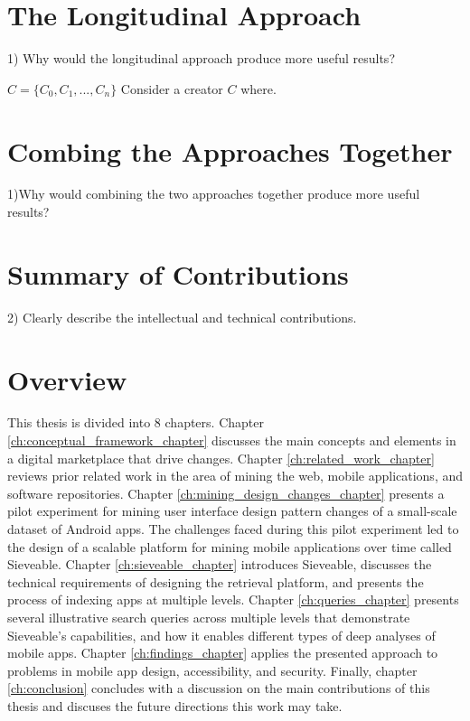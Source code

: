 \section{The Longitudinal Approach}
1) Why would the longitudinal approach produce more useful results?
\pagebreak

$C=\{C_0, C_1,..., C_n\}$ Consider a creator $C$ where.

\section{Combing the Approaches Together}
1)Why would combining the two approaches together produce more useful results?
\pagebreak

\section{Summary of Contributions}
2) Clearly describe the intellectual and technical contributions.
\pagebreak

\section{Overview}
This thesis is divided into 8 chapters.
Chapter \ref{ch:conceptual_framework_chapter} discusses the main concepts and elements in a digital marketplace that drive changes.
Chapter \ref{ch:related_work_chapter} reviews prior related work in the area of mining the web, mobile applications, and software repositories.
Chapter \ref{ch:mining_design_changes_chapter} presents a pilot experiment for mining user interface design pattern changes of a small-scale dataset of Android apps.
The challenges faced during this pilot experiment led to the design of a scalable platform for mining mobile applications over time called Sieveable.
Chapter \ref{ch:sieveable_chapter} introduces Sieveable, discusses the technical requirements of designing the retrieval platform, and presents the process of indexing apps at multiple levels.
Chapter \ref{ch:queries_chapter} presents several illustrative search queries across multiple levels that demonstrate Sieveable's capabilities, and how it enables different types of deep analyses of mobile apps.
Chapter \ref{ch:findings_chapter} applies the presented approach to problems in mobile app design, accessibility, and security.
Finally, chapter \ref{ch:conclusion} concludes with a discussion on the main contributions of this thesis and discuses the future directions this work may take.
